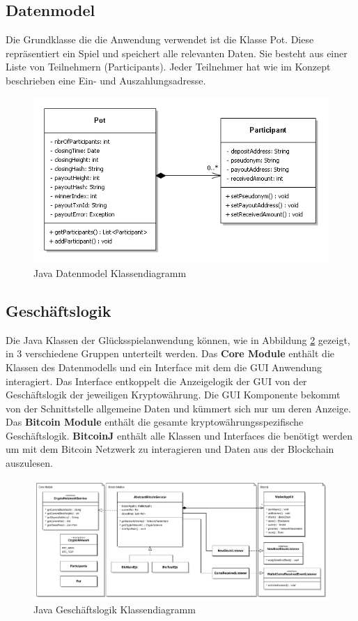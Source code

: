 \subsection{Datenmodel}
Die Grundklasse die die Anwendung verwendet ist die Klasse Pot. Diese repräsentiert ein Spiel und speichert alle relevanten Daten. Sie besteht aus einer Liste von Teilnehmern (Participants). Jeder Teilnehmer hat wie im Konzept beschrieben eine Ein- und Auszahlungsadresse.
\begin{figure}[H]
\centering
\includegraphics[width=1\linewidth]{Figures/umsetzung_btc/btc_datenmodell}
\decoRule
\caption{Java Datenmodel Klassendiagramm}
\label{fig:btc_datenmodell}
\end{figure}


\subsection{Geschäftslogik}

Die Java Klassen der Glücksspielanwendung können, wie in Abbildung \ref{fig:btc_businesslogic} gezeigt, in 3 verschiedene Gruppen unterteilt werden. Das \textbf{Core Module} enthält die Klassen des Datenmodells und ein Interface mit dem die GUI Anwendung interagiert. Das Interface entkoppelt die Anzeigelogik der GUI von der Geschäftslogik der jeweiligen Kryptowährung. Die GUI Komponente bekommt von der Schnittstelle allgemeine Daten und kümmert sich nur um deren Anzeige.
Das \textbf{Bitcoin Module} enthält die gesamte kryptowährungsspezifische Geschäftslogik. \textbf{BitcoinJ} enthält alle Klassen und Interfaces die benötigt werden um mit dem Bitcoin Netzwerk zu interagieren und Daten aus der Blockchain auszulesen.

\begin{figure}[H]
\centering
\includegraphics[width=1\linewidth]{Figures/umsetzung_btc/btc_businesslogic_pdf}
\decoRule
\caption{Java Geschäftslogik Klassendiagramm}
\label{fig:btc_businesslogic}
\end{figure}

